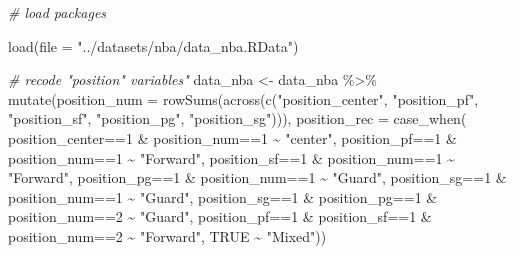 \documentclass[
]{book}
\newenvironment{Shaded}{\begin{snugshade}}{\end{snugshade}}
\newcommand{\AttributeTok}[1]{\textcolor[rgb]{0.77,0.63,0.00}{#1}}
\newcommand{\AttributeTok}[1]{\textcolor[rgb]{0.13,0.29,0.53}{#1}}
\newcommand{\CommentTok}[1]{\textcolor[rgb]{0.56,0.35,0.01}{\textit{#1}}}
\newcommand{\ConstantTok}[1]{\textcolor[rgb]{0.00,0.00,0.00}{#1}}
\newcommand{\ConstantTok}[1]{\textcolor[rgb]{0.56,0.35,0.01}{#1}}
\newcommand{\DecValTok}[1]{\textcolor[rgb]{0.00,0.00,0.81}{#1}}
\newcommand{\FunctionTok}[1]{\textcolor[rgb]{0.00,0.00,0.00}{#1}}
\newcommand{\FunctionTok}[1]{\textcolor[rgb]{0.13,0.29,0.53}{\textbf{#1}}}
\newcommand{\NormalTok}[1]{#1}
\newcommand{\OtherTok}[1]{\textcolor[rgb]{0.56,0.35,0.01}{#1}}
\newcommand{\SpecialCharTok}[1]{\textcolor[rgb]{0.00,0.00,0.00}{#1}}
\newcommand{\SpecialCharTok}[1]{\textcolor[rgb]{0.81,0.36,0.00}{\textbf{#1}}}
\newcommand{\StringTok}[1]{\textcolor[rgb]{0.31,0.60,0.02}{#1}}
\begin{document}
\begin{Shaded}
\begin{Highlighting}[]
\CommentTok{\# load packages}

\FunctionTok{load}\NormalTok{(}\AttributeTok{file =} \StringTok{"../datasets/nba/data\_nba.RData"}\NormalTok{)}



\CommentTok{\# recode "position" variables"}
\NormalTok{data\_nba }\OtherTok{\textless{}{-}}\NormalTok{ data\_nba }\SpecialCharTok{\%\textgreater{}\%}
  \FunctionTok{mutate}\NormalTok{(}\AttributeTok{position\_num =} \FunctionTok{rowSums}\NormalTok{(}\FunctionTok{across}\NormalTok{(}\FunctionTok{c}\NormalTok{(}\StringTok{"position\_center"}\NormalTok{, }\StringTok{"position\_pf"}\NormalTok{, }\StringTok{"position\_sf"}\NormalTok{,}
                                         \StringTok{"position\_pg"}\NormalTok{, }\StringTok{"position\_sg"}\NormalTok{))),}
         \AttributeTok{position\_rec =} 
           \FunctionTok{case\_when}\NormalTok{(}
\NormalTok{             position\_center}\SpecialCharTok{==}\DecValTok{1} \SpecialCharTok{\&}\NormalTok{ position\_num}\SpecialCharTok{==}\DecValTok{1} \SpecialCharTok{\textasciitilde{}} \StringTok{"center"}\NormalTok{,}
\NormalTok{             position\_pf}\SpecialCharTok{==}\DecValTok{1} \SpecialCharTok{\&}\NormalTok{ position\_num}\SpecialCharTok{==}\DecValTok{1} \SpecialCharTok{\textasciitilde{}} \StringTok{"Forward"}\NormalTok{,}
\NormalTok{             position\_sf}\SpecialCharTok{==}\DecValTok{1} \SpecialCharTok{\&}\NormalTok{ position\_num}\SpecialCharTok{==}\DecValTok{1} \SpecialCharTok{\textasciitilde{}} \StringTok{"Forward"}\NormalTok{,}
\NormalTok{             position\_pg}\SpecialCharTok{==}\DecValTok{1} \SpecialCharTok{\&}\NormalTok{ position\_num}\SpecialCharTok{==}\DecValTok{1} \SpecialCharTok{\textasciitilde{}} \StringTok{"Guard"}\NormalTok{,}
\NormalTok{             position\_sg}\SpecialCharTok{==}\DecValTok{1} \SpecialCharTok{\&}\NormalTok{ position\_num}\SpecialCharTok{==}\DecValTok{1} \SpecialCharTok{\textasciitilde{}} \StringTok{"Guard"}\NormalTok{,}
\NormalTok{             position\_sg}\SpecialCharTok{==}\DecValTok{1} \SpecialCharTok{\&}\NormalTok{ position\_pg}\SpecialCharTok{==}\DecValTok{1} \SpecialCharTok{\&}\NormalTok{ position\_num}\SpecialCharTok{==}\DecValTok{2} \SpecialCharTok{\textasciitilde{}} \StringTok{"Guard"}\NormalTok{,}
\NormalTok{             position\_pf}\SpecialCharTok{==}\DecValTok{1} \SpecialCharTok{\&}\NormalTok{ position\_sf}\SpecialCharTok{==}\DecValTok{1} \SpecialCharTok{\&}\NormalTok{ position\_num}\SpecialCharTok{==}\DecValTok{2} \SpecialCharTok{\textasciitilde{}} \StringTok{"Forward"}\NormalTok{,}
             \ConstantTok{TRUE} \SpecialCharTok{\textasciitilde{}} \StringTok{"Mixed"}\NormalTok{))}


\end{Highlighting}
\end{Shaded}
\end{document}
